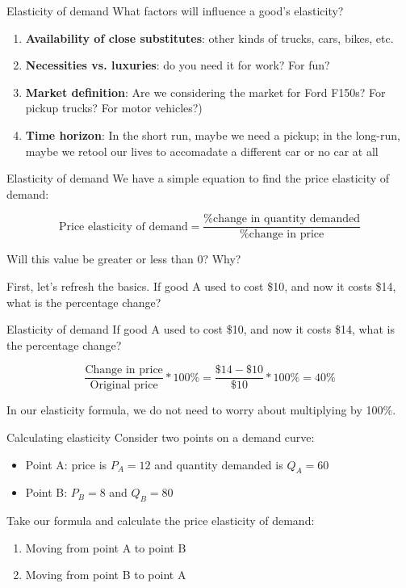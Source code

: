 \documentclass[aspectratio=169]{beamer}
\begin{document}
\begin{frame}{Elasticity of demand}
    What factors will influence a good's elasticity?

    \begin{enumerate}
        \item \textbf{Availability of close substitutes}: other kinds of trucks, cars, bikes, etc.
        \item \textbf{Necessities vs. luxuries}: do you need it for work? For fun?
        \item \textbf{Market definition}: Are we considering the market for Ford F150s? For pickup trucks? For motor vehicles?)
        \item \textbf{Time horizon}: In the short run, maybe we need a pickup; in the long-run, maybe we retool our lives to accomadate a different car or no car at all
    \end{enumerate}
\end{frame}

\begin{frame}{Elasticity of demand}
    We have a simple equation to find the price elasticity of demand:

    $$
    \text{Price elasticity of demand} = \dfrac{\text{\% change in quantity demanded}}{\text{\% change in price}}
    $$

    Will this value be greater or less than 0? Why?

    \medskip

    First, let's refresh the basics. If good A used to cost \$10, and now it costs \$14, what is the percentage change?
\end{frame}

\begin{frame}{Elasticity of demand}
    If good A used to cost \$10, and now it costs \$14, what is the percentage change?

    $$
    \dfrac{\text{Change in price}}{\text{Original price}} * 100\% = \dfrac{\$14 - \$10}{\$10} * 100\% = 40\%
    $$

    In our elasticity formula, we do not need to worry about multiplying by 100\%.
\end{frame}

\begin{frame}{Calculating elasticity}
    Consider two points on a demand curve:
    \begin{itemize}
        \item Point A: price is $P_A=12$ and quantity demanded is $Q_A=60$
        \item Point B: $P_B=8$ and $Q_B=80$
    \end{itemize}
    Take our formula and calculate the price elasticity of demand:
    \begin{enumerate}
        \item Moving from point A to point B
        \item Moving from point B to point A
    \end{enumerate}
\end{frame}
\end{document}
